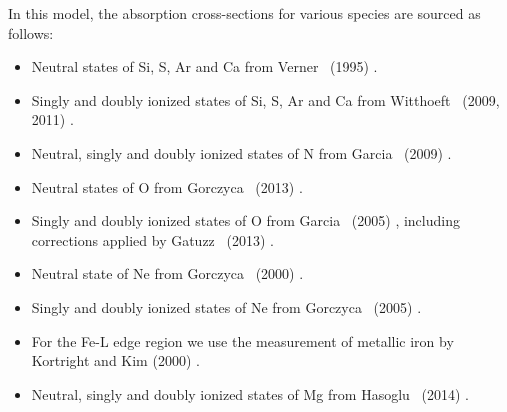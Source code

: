			In this model, the absorption cross-sections for various species are sourced as follows:
			\begin{itemize}
				\item Neutral states of Si, S, Ar and Ca from Verner \etal\ (1995) \cite{vernerXS}.
				\item Singly and doubly ionized states of Si, S, Ar and Ca from Witthoeft \etal\ (2009, 2011) \cite{witthoeftXS1,witthoeftXS2}.
				\item Neutral, singly and doubly ionized states of N from Garcia \etal\ (2009) \cite{garciaXS1}.
				\item Neutral states of O from Gorczyca \etal\ (2013) \cite{gorczycaXS1}.
				\item Singly and doubly ionized states of O from Garcia \etal\ (2005) \cite{garciaXS2}, including corrections applied by Gatuzz \etal\ (2013) \cite{gatuzzXS}.
				\item Neutral state of Ne from Gorczyca \etal\ (2000) \cite{gorczycaXS2}.
				\item Singly and doubly ionized states of Ne from Gorczyca \etal\ (2005) \cite{gorczycaXS3}.
				\item For the Fe-L edge region we use the measurement of metallic iron by Kortright and Kim (2000) \cite{kortrightXS}.
				\item Neutral, singly and doubly ionized states of Mg from Hasoglu \etal\ (2014) \cite{hasogluXS}.
			\end{itemize}
			
